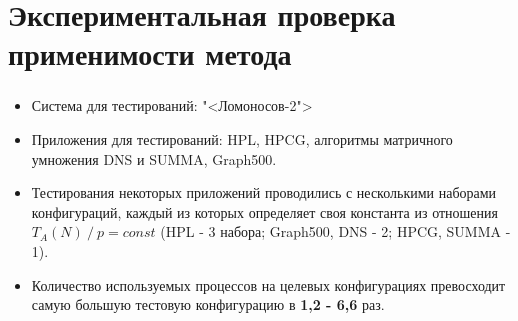 \documentclass[unicode, t, 11pt]{beamer}%
\begin{document}
	\section{Экспериментальная проверка применимости метода}
		\begin{frame}
			\frametitle{\insertsection}
			\begin{itemize}[label = \(\bullet\)]

			\item Система для тестирований: "<Ломоносов-2">
			\item Приложения для тестирований: HPL, HPCG, алгоритмы матричного умножения DNS и SUMMA, Graph500.


			\item Тестирования некоторых приложений проводились с несколькими наборами конфигураций, каждый из которых определяет своя константа из отношения \(T_A(N)\:/\:p = const\) (HPL - 3 набора; Graph500, DNS - 2; HPCG, SUMMA - 1).

			\item Количество используемых процессов на целевых конфигурациях превосходит самую большую тестовую конфигурацию в \textbf{1,2 - 6,6} раз.
			\end{itemize}
		\end{frame}
\end{document}
